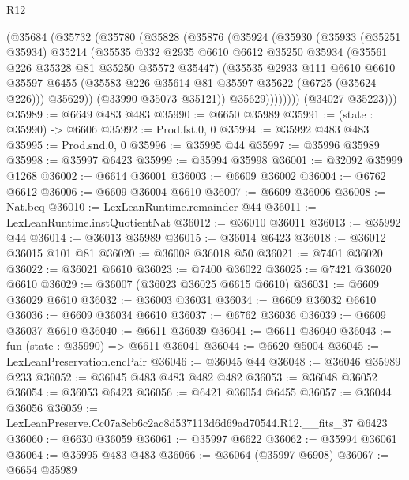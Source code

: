 \begin{lexlean}{R12}
\begin{coremodule}
          (@35684
            (@35732
              (@35780
                (@35828
                  (@35876
                    (@35924
                      (@35930
                        (@35933
                          (@35251 @35934)
                          @35214
                          (@35535
                            @332
                            @2935
                            @6610
                            @6612
                            @35250
                            @35934
                            (@35561 @226 @35328 @81 @35250 @35572 @35447)
                            (@35535
                              @2933
                              @111
                              @6610
                              @6610
                              @35597
                              @6455
                              (@35583 @226 @35614 @81 @35597 @35622 (@6725 (@35624 @226)))
                              @35629))
                          (@33990 @35073 @35121))
                        @35629))))))))
        (@34027 @35223)))
@35989 := @6649 @483 @483
@35990 := @6650 @35989
@35991 := (state : @35990) -> @6606
@35992 := Prod.fst.{0, 0}
@35994 := @35992 @483 @483
@35995 := Prod.snd.{0, 0}
@35996 := @35995 @44
@35997 := @35996 @35989
@35998 := @35997 @6423
@35999 := @35994 @35998
@36001 := @32092 @35999 @1268
@36002 := @6614 @36001
@36003 := @6609 @36002
@36004 := @6762 @6612
@36006 := @6609 @36004 @6610
@36007 := @6609 @36006
@36008 := Nat.beq
@36010 := LexLeanRuntime.remainder @44
@36011 := LexLeanRuntime.instQuotientNat
@36012 := @36010 @36011
@36013 := @35992 @44
@36014 := @36013 @35989
@36015 := @36014 @6423
@36018 := @36012 @36015 @101 @81
@36020 := @36008 @36018 @50
@36021 := @7401 @36020
@36022 := @36021 @6610
@36023 := @7400 @36022
@36025 := @7421 @36020 @6610
@36029 := @36007 (@36023 @36025 @6615 @6610)
@36031 := @6609 @36029 @6610
@36032 := @36003 @36031
@36034 := @6609 @36032 @6610
@36036 := @6609 @36034 @6610
@36037 := @6762 @36036
@36039 := @6609 @36037 @6610
@36040 := @6611 @36039
@36041 := @6611 @36040
@36043 := fun (state : @35990) => @6611 @36041
@36044 := @6620 @5004
@36045 := LexLeanPreservation.encPair
@36046 := @36045 @44
@36048 := @36046 @35989 @233
@36052 := @36045 @483 @483 @482 @482
@36053 := @36048 @36052
@36054 := @36053 @6423
@36056 := @6421 @36054 @6455
@36057 := @36044 @36056
@36059 := LexLeanPreserve.Cc07a8cb6c2ac8d537113d6d69ad70544.R12.__fits_37 @6423
@36060 := @6630 @36059
@36061 := @35997 @6622
@36062 := @35994 @36061
@36064 := @35995 @483 @483
@36066 := @36064 (@35997 @6908)
@36067 := @6654 @35989

\end{coremodule}
\end{lexlean}
